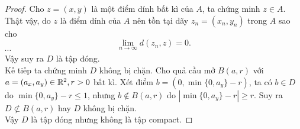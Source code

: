 \begin{proof}
Cho $z = (x,y)$ là một điểm dính bất kì của $A$, ta chứng minh $z \in A$. Thật vậy, do $z$ là điểm dính của $A$ nên tồn tại dãy $z_n = (x_n, y_n)$ trong $A$ sao cho
$$
    \lim_{n \to \infty} d(z_n,z) = 0.
$$
$\cdots$\\
Vậy suy ra $D$ là tập đóng.\\[3mm]
Kế tiếp ta chứng minh $D$ không bị chặn. Cho quả cầu mở $B(a,r)$ với $a = (a_x, a_y) \in \mathbb R^2, r > 0$ bất kì. Xét điểm $b = (0, \min\{0, a_y\}-r)$, ta có $b \in D$ do $\min\{0, a_y\} - r \leq 1$, nhưng $b \notin B(a,r)$ do $|\min\{0, a_y\} - r| \geq r$. Suy ra $D \not\subset B(a,r)$ hay $D$ không bị chặn.\\
Vậy $D$ là tập đóng nhưng không là tập compact.
\end{proof}


